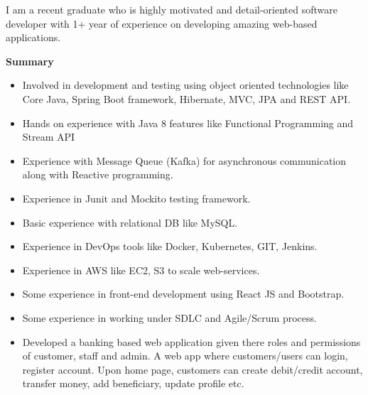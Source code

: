\documentclass[10pt,a4paper,ragged2e,withhyper]{altacv}
\begin{document}
\begin{paracol}{2}

I am a recent graduate who is highly motivated and detail-oriented software developer with 1+ year of experience on developing amazing web-based applications. \\
\divider

\textbf{Summary}
\begin{itemize}
\item Involved in development and testing using object oriented technologies like Core Java, Spring Boot framework, Hibernate, MVC, JPA and REST API.
\item Hands on experience with Java 8 features like Functional Programming and Stream API
\item Experience with Message Queue (Kafka) for asynchronous communication along with Reactive programming.
\item Experience in Junit and Mockito testing framework.
\item Basic experience with relational DB like MySQL.
\item Experience in DevOps tools like Docker, Kubernetes, GIT, Jenkins.
\item Experience in AWS like EC2, S3 to scale web-services.
\item Some experience in front-end development using React JS and Bootstrap.
\item Some experience in working under SDLC and Agile/Scrum process.
\end{itemize}
\vspace{10pt}

\begin{itemize}
\item Developed a banking based web application given there roles and permissions of customer, staff and admin. A web app where customers/users can login, register account. Upon home page, customers can create debit/credit account, transfer money, add beneficiary, update profile etc. \\
\divider


\end{itemize}
\end{paracol}
\end{document}

